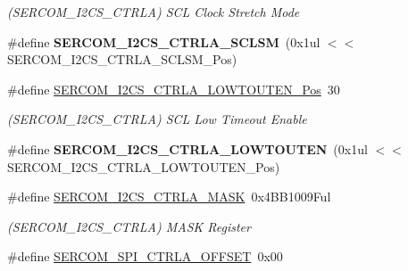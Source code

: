 \begin{DoxyCompactItemize}
\begin{DoxyCompactList}\small\item\em (S\+E\+R\+C\+O\+M\+\_\+\+I2\+C\+S\+\_\+\+C\+T\+R\+L\+A) S\+C\+L Clock Stretch Mode \end{DoxyCompactList}\item 
\hypertarget{group___s_a_m_l21___s_e_r_c_o_m_ga026eef82801f2a35002009d7fb286155}{}\#define {\bfseries S\+E\+R\+C\+O\+M\+\_\+\+I2\+C\+S\+\_\+\+C\+T\+R\+L\+A\+\_\+\+S\+C\+L\+S\+M}~(0x1ul $<$$<$ S\+E\+R\+C\+O\+M\+\_\+\+I2\+C\+S\+\_\+\+C\+T\+R\+L\+A\+\_\+\+S\+C\+L\+S\+M\+\_\+\+Pos)\label{group___s_a_m_l21___s_e_r_c_o_m_ga026eef82801f2a35002009d7fb286155}

\item 
\hypertarget{group___s_a_m_l21___s_e_r_c_o_m_ga6fa50264b4e64fc2f54c940486b205a8}{}\#define \hyperlink{group___s_a_m_l21___s_e_r_c_o_m_ga6fa50264b4e64fc2f54c940486b205a8}{S\+E\+R\+C\+O\+M\+\_\+\+I2\+C\+S\+\_\+\+C\+T\+R\+L\+A\+\_\+\+L\+O\+W\+T\+O\+U\+T\+E\+N\+\_\+\+Pos}~30\label{group___s_a_m_l21___s_e_r_c_o_m_ga6fa50264b4e64fc2f54c940486b205a8}

\begin{DoxyCompactList}\small\item\em (S\+E\+R\+C\+O\+M\+\_\+\+I2\+C\+S\+\_\+\+C\+T\+R\+L\+A) S\+C\+L Low Timeout Enable \end{DoxyCompactList}\item 
\hypertarget{group___s_a_m_l21___s_e_r_c_o_m_ga2530ee9d6d9364c37db47f66cf0dc193}{}\#define {\bfseries S\+E\+R\+C\+O\+M\+\_\+\+I2\+C\+S\+\_\+\+C\+T\+R\+L\+A\+\_\+\+L\+O\+W\+T\+O\+U\+T\+E\+N}~(0x1ul $<$$<$ S\+E\+R\+C\+O\+M\+\_\+\+I2\+C\+S\+\_\+\+C\+T\+R\+L\+A\+\_\+\+L\+O\+W\+T\+O\+U\+T\+E\+N\+\_\+\+Pos)\label{group___s_a_m_l21___s_e_r_c_o_m_ga2530ee9d6d9364c37db47f66cf0dc193}

\item 
\hypertarget{group___s_a_m_l21___s_e_r_c_o_m_gab8ffa0fe78ed6da3f431811f007f3504}{}\#define \hyperlink{group___s_a_m_l21___s_e_r_c_o_m_gab8ffa0fe78ed6da3f431811f007f3504}{S\+E\+R\+C\+O\+M\+\_\+\+I2\+C\+S\+\_\+\+C\+T\+R\+L\+A\+\_\+\+M\+A\+S\+K}~0x4\+B\+B1009\+Ful\label{group___s_a_m_l21___s_e_r_c_o_m_gab8ffa0fe78ed6da3f431811f007f3504}

\begin{DoxyCompactList}\small\item\em (S\+E\+R\+C\+O\+M\+\_\+\+I2\+C\+S\+\_\+\+C\+T\+R\+L\+A) M\+A\+S\+K Register \end{DoxyCompactList}\item 
\hypertarget{group___s_a_m_l21___s_e_r_c_o_m_ga72986752fedd413e6f842101677e7f52}{}\#define \hyperlink{group___s_a_m_l21___s_e_r_c_o_m_ga72986752fedd413e6f842101677e7f52}{S\+E\+R\+C\+O\+M\+\_\+\+S\+P\+I\+\_\+\+C\+T\+R\+L\+A\+\_\+\+O\+F\+F\+S\+E\+T}~0x00\label{group___s_a_m_l21___s_e_r_c_o_m_ga72986752fedd413e6f842101677e7f52}


\end{DoxyCompactItemize}
